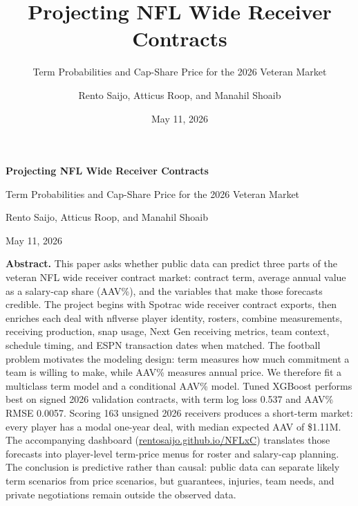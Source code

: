 \documentclass[
  10pt,
]{article}
\title{Projecting NFL Wide Receiver Contracts}
\subtitle{Term Probabilities and Cap-Share Price for the 2026 Veteran Market}
\author{Rento Saijo, Atticus Roop, and Manahil Shoaib}
\date{May 11, 2026}
\renewcommand{\maketitle}{}
\begin{document}
\maketitle

\begin{titlepage}
\thispagestyle{empty}
\begin{center}
\vspace*{0.72in}
{\LARGE\bfseries Projecting NFL Wide Receiver Contracts\par}
\vspace{0.20in}
{\large Term Probabilities and Cap-Share Price for the 2026 Veteran Market\par}
\vspace{0.32in}
{\normalsize Rento Saijo, Atticus Roop, and Manahil Shoaib\par}
\vspace{0.12in}
{\normalsize May 11, 2026\par}
\end{center}
\vspace{0.35in}
\begin{center}
\begin{minipage}{0.78\textwidth}
\small
\textbf{Abstract.} This paper asks whether public data can predict three parts of the veteran NFL wide receiver contract market: contract term, average annual value as a salary-cap share (AAV\%), and the variables that make those forecasts credible. The project begins with Spotrac wide receiver contract exports, then enriches each deal with nflverse player identity, rosters, combine measurements, receiving production, snap usage, Next Gen receiving metrics, team context, schedule timing, and ESPN transaction dates when matched. The football problem motivates the modeling design: term measures how much commitment a team is willing to make, while AAV\% measures annual price. We therefore fit a multiclass term model and a conditional AAV\% model. Tuned XGBoost performs best on signed 2026 validation contracts, with term log loss 0.537 and AAV\% RMSE 0.0057. Scoring 163 unsigned 2026 receivers produces a short-term market: every player has a modal one-year deal, with median expected AAV of \$1.11M. The accompanying dashboard (\href{https://rentosaijo.github.io/NFLxC/}{rentosaijo.github.io/NFLxC}) translates those forecasts into player-level term-price menus for roster and salary-cap planning. The conclusion is predictive rather than causal: public data can separate likely term scenarios from price scenarios, but guarantees, injuries, team needs, and private negotiations remain outside the observed data.
\end{minipage}
\end{center}
\end{titlepage}
\setcounter{page}{1}
\end{document}
